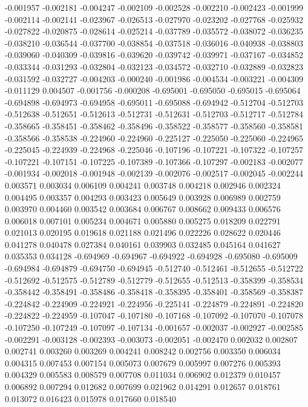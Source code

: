 -0.001957
-0.002181
-0.004247
-0.002109
-0.002528
-0.002210
-0.002423
-0.001999
-0.002114
-0.002141
-0.023967
-0.026513
-0.027970
-0.023202
-0.027768
-0.025932
-0.027822
-0.020875
-0.028614
-0.025214
-0.037789
-0.035572
-0.038072
-0.036235
-0.038210
-0.036544
-0.037700
-0.038854
-0.037518
-0.036016
-0.040938
-0.038803
-0.039060
-0.040309
-0.039816
-0.039620
-0.039742
-0.039971
-0.037167
-0.034852
-0.033344
-0.031293
-0.032804
-0.032123
-0.034572
-0.032710
-0.032889
-0.032823
-0.031592
-0.032727
-0.004203
-0.000240
-0.001986
-0.004534
-0.003221
-0.004309
-0.011129
0.004507
-0.001756
-0.000208
-0.695001
-0.695050
-0.695015
-0.695064
-0.694898
-0.694973
-0.694958
-0.695011
-0.695088
-0.694942
-0.512704
-0.512703
-0.512638
-0.512651
-0.512613
-0.512731
-0.512631
-0.512703
-0.512717
-0.512784
-0.358665
-0.358451
-0.358462
-0.358496
-0.358522
-0.358577
-0.358560
-0.358581
-0.358566
-0.358538
-0.224960
-0.224960
-0.225127
-0.225050
-0.225060
-0.224965
-0.225045
-0.224939
-0.224968
-0.225046
-0.107196
-0.107221
-0.107322
-0.107257
-0.107221
-0.107151
-0.107225
-0.107389
-0.107366
-0.107297
-0.002183
-0.002077
-0.001934
-0.002018
-0.001948
-0.002139
-0.002076
-0.002517
-0.002045
-0.002244
0.003571
0.003034
0.006109
0.004241
0.003748
0.004218
0.002946
0.002324
0.004495
0.003357
0.004293
0.003423
0.005649
0.003928
0.006989
0.002759
0.003970
0.004460
0.003542
0.003684
0.006767
0.008662
0.009433
0.006576
0.006018
0.007101
0.005234
0.004671
0.005880
0.005275
0.018209
0.022791
0.021013
0.020195
0.019618
0.021188
0.021496
0.022226
0.028622
0.020446
0.041278
0.040478
0.027384
0.040161
0.039903
0.032485
0.045164
0.041627
0.035353
0.034128
-0.694969
-0.694967
-0.694922
-0.694928
-0.695080
-0.695009
-0.694984
-0.694879
-0.694750
-0.694945
-0.512740
-0.512461
-0.512655
-0.512722
-0.512692
-0.512575
-0.512789
-0.512779
-0.512655
-0.512513
-0.358399
-0.358534
-0.358442
-0.358491
-0.358486
-0.358418
-0.358395
-0.358401
-0.358569
-0.358387
-0.224842
-0.224909
-0.224921
-0.224956
-0.225141
-0.224879
-0.224891
-0.224820
-0.224822
-0.224959
-0.107047
-0.107180
-0.107168
-0.107092
-0.107070
-0.107078
-0.107250
-0.107249
-0.107097
-0.107134
-0.001657
-0.002037
-0.002927
-0.002585
-0.002291
-0.003128
-0.002393
-0.003073
-0.002051
-0.002470
0.002032
0.002807
0.002741
0.003260
0.003269
0.004241
0.008242
0.002756
0.003350
0.006034
0.004315
0.007453
0.007154
0.005073
0.007679
0.005997
0.007276
0.005393
0.004329
0.005583
0.008579
0.007708
0.011034
0.006902
0.012379
0.010457
0.006892
0.007294
0.012682
0.007699
0.021962
0.014291
0.012657
0.018761
0.013072
0.016423
0.015978
0.017660
0.018540
